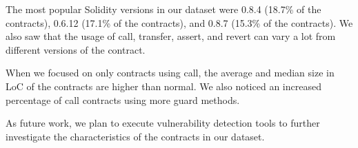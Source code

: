 \documentclass[10pt,conference]{IEEEtran}
\begin{document}
The most popular Solidity versions in our dataset were 0.8.4 (18.7\% of the contracts), 0.6.12 (17.1\% of the contracts), and 0.8.7 (15.3\% of the contracts). We also saw that the usage of call, transfer, assert, and revert can vary a lot from different versions of the contract.

When we focused on only contracts using call, the average and median size in LoC of the contracts are higher than normal. We also noticed an increased percentage of call contracts using more guard methods.

As future work, we plan to execute vulnerability detection tools to further investigate the characteristics of the contracts in our dataset.






\end{document}
